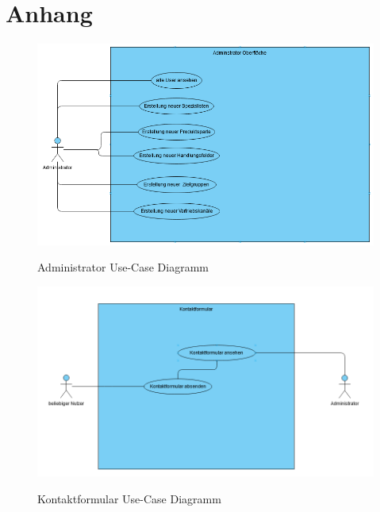 \section*{Anhang}

\anhangsverzeichnis

\label{Anhang-Use-Cases}

\label{Anhang-Admin}
\begin{figure}[hbt]
\centering
\begin{minipage}[t]{1\textwidth} 
\caption{Administrator Use-Case Diagramm} 
\includegraphics[width=1\textwidth]{img/admin-use-case.png}\\
\end{minipage}
\end{figure}

\label{Anhang-Kontakt}
\begin{figure}[hbt]
\centering
\begin{minipage}[t]{1\textwidth} 
\caption{Kontaktformular Use-Case Diagramm} 
\includegraphics[width=1\textwidth]{img/kontakt-use-case.png}\\
\end{minipage}
\end{figure}
